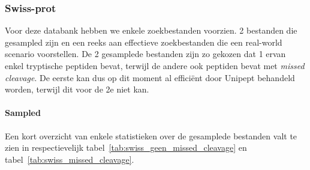 \documentclass[11pt,dutch,faculty=we,layout=titlefont,underline=false,titleUppercase=true,titleUnderline=true]{ugent2016-report}
\begin{document}
    \subsubsection{Swiss-prot} Voor deze databank hebben we enkele zoekbestanden voorzien.
    2 bestanden die gesampled zijn en een reeks aan effectieve zoekbestanden die een real-world scenario voorstellen.
    De 2 gesamplede bestanden zijn zo gekozen dat 1 ervan enkel tryptische peptiden bevat, terwijl de andere ook peptiden bevat met \textit{missed cleavage}.
    De eerste kan dus op dit moment al efficiënt door Unipept behandeld worden, terwijl dit voor de 2e niet kan.

    \paragraph{Sampled}
    Een kort overzicht van enkele statistieken over de gesamplede bestanden valt te zien in respectievelijk tabel~\ref{tab:swiss_geen_missed_cleavage} en tabel~\ref{tab:swiss_missed_cleavage}.
\end{document}
